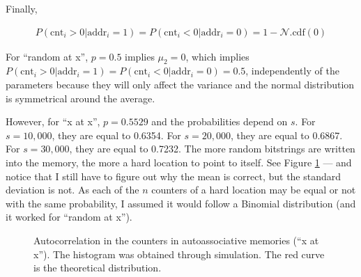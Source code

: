 \documentclass[12pt]{article}
\begin{document}
Finally,

\begin{align}
P(\text{cnt}_i > 0 | \text{addr}_i = 1) = P(\text{cnt}_i < 0 | \text{addr}_i = 0) = 1 - \mathcal{N}.\text{cdf}(0)
\end{align}

For ``random at x'', $p=0.5$ implies $\mu_2 = 0$, which implies $P(\text{cnt}_i > 0 | \text{addr}_i = 1) = P(\text{cnt}_i < 0 | \text{addr}_i = 0) = 0.5$, independently of the parameters because they will only affect the variance and the normal distribution is symmetrical around the average.

However, for ``x at x'', $p=0.5529$ and the probabilities depend on $s$. For $s=10,000$, they are equal to 0.6354. For $s=20,000$, they are equal to 0.6867. For $s=30,000$, they are equal to 0.7232. The more random bitstrings are written into the memory, the more a hard location to point to itself. See Figure \ref{fig:sdm-corr-prob} --- and notice that I still have to figure out why the mean is correct, but the standard deviation is not. As each of the $n$ counters of a hard location may be equal or not with the same probability, I assumed it would follow a Binomial distribution (and it worked for ``random at x'').

\begin{figure}[h!]
  \centering

  \caption{Autocorrelation in the counters in autoassociative memories (``x at x''). The histogram was obtained through simulation. The red curve is the theoretical distribution.}
  \label{fig:sdm-corr-prob}
\end{figure}
\end{document}
